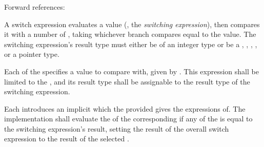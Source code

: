 
\begin{grammar}
 \\
	 \terminal{(}  \terminal{)} \terminal{\{}  \terminal{\}} \\

 \\
	  \\

 \\
	  \terminal{=>}  \\
	 \terminal{=>}  \\

 \\
	 \optional{\terminal{,}} \\
	 \terminal{,}  \\
\end{grammar}

Forward references: 

\specsubsubitem
A switch expression evaluates a value (, the
\textit{switching expression}), then compares it with a number of
, taking whichever branch compares equal to the value.
The switching expression's result type must either be of an integer type or be a
, , , , or a
pointer type.

\specsubsubitem
Each of the  specifies a value to compare with, given
by . This expression shall be limited to the
, and its result type shall be
assignable to the result type of the switching expression.

\specsubsubitem
Each  introduces an implicit
 which the provided
 gives the expressions of. The implementation
shall evaluate the  of the corresponding
 if any of the  is equal to
the switching expression's result, setting the result of the overall switch
expression to the result of the selected .

